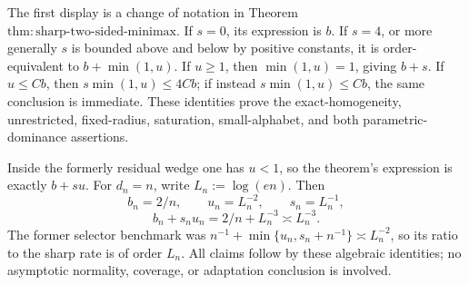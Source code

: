 The first display is a change of notation in Theorem~\(\mathrm{thm:sharp\text{-}two\text{-}sided\text{-}minimax}\).  If \(s=0\), its expression is \(b\).  If \(s=4\), or more generally \(s\) is bounded above and below by positive constants, it is order-equivalent to \(b+\min(1,u)\).  If \(u\ge1\), then \(\min(1,u)=1\), giving \(b+s\).  If \(u\le Cb\), then \(s\min(1,u)\le4Cb\); if instead \(s\min(1,u)\le Cb\), the same conclusion is immediate.  These identities prove the exact-homogeneity, unrestricted, fixed-radius, saturation, small-alphabet, and both parametric-dominance assertions.

Inside the formerly residual wedge one has \(u<1\), so the theorem's expression is exactly \(b+su\).  For \(d_n=n\), write \(L_n:=\log(en)\).  Then
\[
 b_n=2/n,\qquad u_n=L_n^{-2},\qquad s_n=L_n^{-1},
\]
\[
 b_n+s_nu_n=2/n+L_n^{-3}\asymp L_n^{-3}.
\]
The former selector benchmark was \(n^{-1}+\min\{u_n,s_n+n^{-1}\}\asymp L_n^{-2}\), so its ratio to the sharp rate is of order \(L_n\).  All claims follow by these algebraic identities; no asymptotic normality, coverage, or adaptation conclusion is involved.